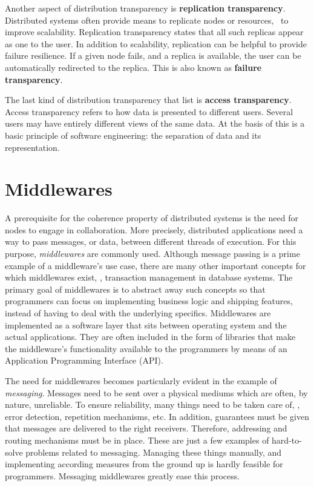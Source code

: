 Another aspect of distribution transparency is \textbf{replication transparency}. Distributed systems often provide means to replicate nodes or resources, \eg\ to improve scalability. Replication transparency states that all such replicas appear as one to the user. In addition to scalability, replication can be helpful to provide failure resilience. If a given node fails, and a replica is available, the user can be automatically redirected to the replica. This is also known as \textbf{failure transparency}.

The last kind of distribution transparency that \citeauthor*{tanenbaum2017distributed} list is \textbf{access transparency}. Access transparency refers to how data is presented to different users. Several users may have entirely different views of the same data. At the basis of this is a basic principle of software engineering: the separation of data and its representation.

%
%
%
%
%
%
%
%
%
%

\section{Middlewares} \label{sec:middlewares}
A prerequisite for the coherence property of distributed systems is the need for nodes to engage in collaboration. More precisely, distributed applications need a way to pass messages, or data, between different threads of execution. For this purpose, \emph{middlewares} \cite{bernstein1996middleware} are commonly used. Although message passing is a prime example of a middleware's use case, there are many other important concepts for which middlewares exist, \eg , transaction management in database systems. The primary goal of middlewares is to abstract away such concepts so that programmers can focus on implementing business logic and shipping features, instead of having to deal with the underlying specifics. Middlewares are implemented as a software layer that sits between operating system and the actual applications. They are often included in the form of libraries that make the middleware's functionality available to the programmers by means of an Application Programming Interface (API). 

The need for middlewares becomes particularly evident in the example of \emph{messaging}. Messages need to be sent over a physical mediums which are often, by nature, unreliable. To ensure reliability, many things need to be taken care of, \eg , error detection, repetition mechanisms, etc. In addition, guarantees must be given that messages are delivered to the right receivers. Therefore, addressing and routing mechanisms must be in place. These are just a few examples of hard-to-solve problems related to messaging. Managing these things manually, and implementing according measures from the ground up is hardly feasible for programmers. Messaging middlewares greatly ease this process. 

